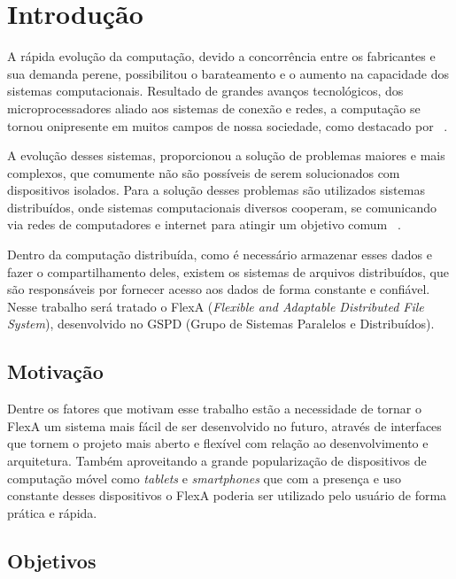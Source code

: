 
\chapter{Introdução}
\label{cap1}

    A rápida evolução da computação, devido a concorrência entre os fabricantes e sua demanda perene, possibilitou o barateamento e o aumento na capacidade dos sistemas computacionais. Resultado de grandes avanços tecnológicos, dos microprocessadores aliado aos sistemas de conexão e redes, a computação se tornou onipresente em muitos campos de nossa sociedade, como destacado por ~\cite{tanenbaum}.

    A evolução desses sistemas, proporcionou a solução de problemas maiores e mais complexos, que comumente não são possíveis de serem solucionados com dispositivos isolados. Para a solução desses problemas são utilizados sistemas distribuídos, onde sistemas computacionais diversos cooperam, se comunicando via redes de computadores e internet para atingir um objetivo comum ~\cite{coulouris}.

    Dentro da computação distribuída, como é necessário armazenar esses dados e fazer o compartilhamento deles, existem os sistemas de arquivos distribuídos, que são responsáveis por fornecer acesso aos dados de forma constante e confiável. Nesse trabalho será tratado o FlexA (\textit{Flexible and Adaptable Distributed File System}), desenvolvido no GSPD (Grupo de Sistemas Paralelos e Distribuídos).


\section{Motivação}

    Dentre os fatores que motivam esse trabalho estão a necessidade de tornar o FlexA um sistema mais fácil de ser desenvolvido no futuro, através de  interfaces que tornem o projeto mais aberto e flexível com relação ao desenvolvimento e arquitetura. Também aproveitando a grande popularização de dispositivos de computação móvel como \textit{tablets} e \textit{smartphones} que com a presença e uso constante desses dispositivos o FlexA poderia ser utilizado pelo usuário de forma prática e rápida.

\section{Objetivos}

